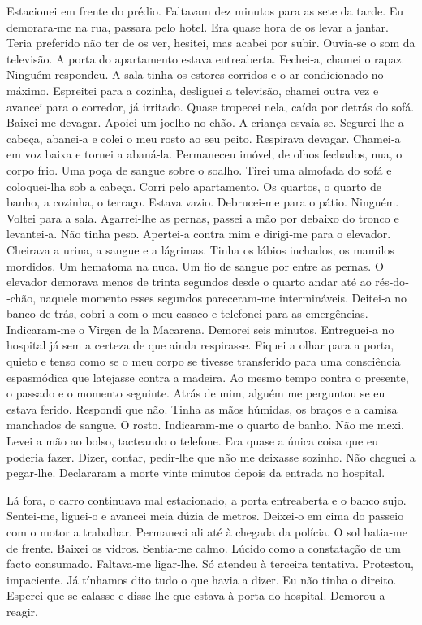 Estacionei em frente do prédio. Faltavam dez minutos para as sete da
tarde. Eu demorara­‑me na rua, passara pelo hotel. Era quase hora de os
levar a jantar. Teria preferido não ter de os ver, hesitei, mas acabei
por subir. Ouvia­‑se o som da televisão. A porta do apartamento estava
entreaberta. Fechei­‑a, chamei o rapaz. Ninguém respondeu. A sala tinha
os estores corridos e o ar condicionado no máximo. Espreitei para a
cozinha, desliguei a televisão, chamei outra vez e avancei para o
corredor, já irritado. Quase tropecei nela, caída por detrás do sofá.
Baixei­‑me devagar. Apoiei um joelho no chão. A criança esvaía­‑se.
Segurei­‑lhe a cabeça, abanei­‑a e colei o meu rosto ao seu peito.
Respirava devagar. Chamei­‑a em voz baixa e tornei a abaná­‑la.
Permaneceu imóvel, de olhos fechados, nua, o corpo frio. Uma poça de
sangue sobre o soalho. Tirei uma almofada do sofá e coloquei­‑lha sob a
cabeça. Corri pelo apartamento. Os quartos, o quarto de banho, a
cozinha, o terraço. Estava vazio. Debrucei­‑me para o pátio. Ninguém.
Voltei para a sala. Agarrei­‑lhe as pernas, passei a mão por debaixo do
tronco e levantei­‑a. Não tinha peso. Apertei­‑a contra mim e dirigi­‑me
para o elevador. Cheirava a urina, a sangue e a lágrimas. Tinha os
lábios inchados, os mamilos mordidos. Um hematoma na nuca. Um fio de
sangue por entre as pernas. O elevador demorava menos de trinta segundos
desde o quarto andar até ao rés­‑do­‑chão, naquele momento esses
segundos pareceram­‑me intermináveis. Deitei­‑a no banco de trás,
cobri­‑a com o meu casaco e telefonei para as emergências. Indicaram­‑me
o Virgen de la Macarena. Demorei seis minutos. Entreguei­‑a no hospital
já sem a certeza de que ainda respirasse. Fiquei a olhar para a porta,
quieto e tenso como se o meu corpo se tivesse transferido para uma
consciência espasmódica que latejasse contra a madeira. Ao mesmo tempo
contra o presente, o passado e o momento seguinte. Atrás de mim, alguém
me perguntou se eu estava ferido. Respondi que não. Tinha as mãos
húmidas, os braços e a camisa manchados de sangue. O rosto.
Indicaram­‑me o quarto de banho. Não me mexi. Levei a mão ao bolso,
tacteando o telefone. Era quase a única coisa que eu poderia fazer.
Dizer, contar, pedir­‑lhe que não me deixasse sozinho. Não cheguei a
pegar­‑lhe. Declararam a morte vinte minutos depois da entrada no
hospital.

Lá fora, o carro continuava mal estacionado, a porta entreaberta e o
banco sujo. Sentei­‑me, liguei­‑o e avancei meia dúzia de metros.
Deixei­‑o em cima do passeio com o motor a trabalhar. Permaneci ali até
à chegada da polícia. O sol batia­‑me de frente. Baixei os vidros.
Sentia­‑me calmo. Lúcido como a constatação de um facto consumado.
Faltava­‑me ligar­‑lhe. Só atendeu à terceira tentativa. Protestou,
impaciente. Já tínhamos dito tudo o que havia a dizer. Eu não tinha o
direito. Esperei que se calasse e disse­‑lhe que estava à porta do
hospital. Demorou a reagir.

